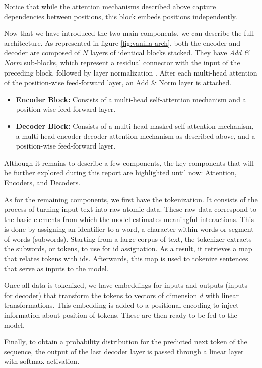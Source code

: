 Notice that while the attention mechanisms described above capture dependencies between positions, this block embeds positions independently.

\vspace{2em}

Now that we have introduced the two main components, we can describe the full architecture. As represented in figure \ref{fig:vanilla-arch}, both the encoder and decoder are composed of $N$ layers of identical blocks stacked. They have \textit{Add \& Norm} sub-blocks, which represent a residual connector with the input of the preceding block, followed by layer normalization \cite{ba2016layer}. After each multi-head attention of the position-wise feed-forward layer, an Add \& Norm layer is attached.
\begin{itemize}
    \item \textbf{Encoder Block:} Consists of a multi-head self-attention mechanism and a position-wise feed-forward layer.
    \item \textbf{Decoder Block:} Consists of a multi-head masked self-attention mechanism, a multi-head encoder-decoder attention mechanism as described above, and a position-wise feed-forward layer.
\end{itemize}

Although it remains to describe a few components, the key components that will be further explored during this report are highlighted until now: Attention, Encoders, and Decoders.

As for the remaining components, we first have the tokenization. It consists of the process of turning input text into raw atomic data. These raw data
correspond to the basic elements from which the model estimates meaningful interactions.
This is done by assigning an identifier to a word, a character within words or segment
of words (subwords). Starting from a large corpus of text, the tokenizer extracts the
subwords, or tokens, to use for id assignation. As a result, it retrieves a map that relates
tokens with ids. Afterwards, this map is used to tokenize sentences that serve as inputs
to the model.

Once all data is tokenized, we have embeddings for inputs and outputs (inputs for decoder) that transform the tokens to vectors of dimension $d$ with linear transformations. This embedding is added to a positional encoding to inject information about position of tokens. These are then ready to be fed to the model.

Finally, to obtain a probability distribution for the predicted next token of the sequence, the output of the last decoder layer is passed through a linear layer with softmax activation.


